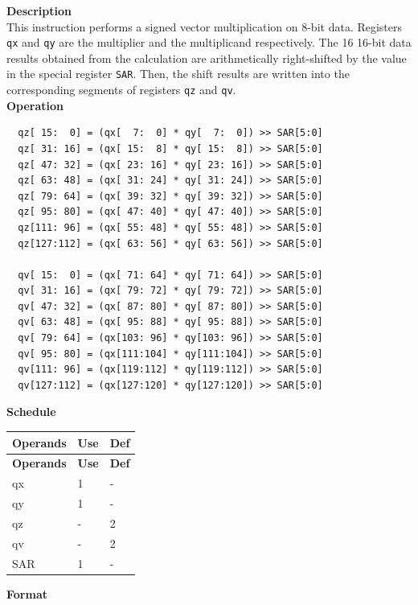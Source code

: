 \textbf{Description}\\
This instruction performs a signed vector multiplication on 8-bit data. Registers \lstinline{qx} and \lstinline{qy} are the multiplier and the multiplicand respectively. The 16 16-bit data results obtained from the calculation are arithmetically right-shifted by the value in the special register \lstinline{SAR}. Then, the shift results are written into the corresponding segments of registers \lstinline{qz} and \lstinline{qv}.\\
\textbf{Operation}
\begin{lstlisting}
  qz[ 15:  0] = (qx[  7:  0] * qy[  7:  0]) >> SAR[5:0]
  qz[ 31: 16] = (qx[ 15:  8] * qy[ 15:  8]) >> SAR[5:0]
  qz[ 47: 32] = (qx[ 23: 16] * qy[ 23: 16]) >> SAR[5:0]
  qz[ 63: 48] = (qx[ 31: 24] * qy[ 31: 24]) >> SAR[5:0]
  qz[ 79: 64] = (qx[ 39: 32] * qy[ 39: 32]) >> SAR[5:0]
  qz[ 95: 80] = (qx[ 47: 40] * qy[ 47: 40]) >> SAR[5:0]
  qz[111: 96] = (qx[ 55: 48] * qy[ 55: 48]) >> SAR[5:0]
  qz[127:112] = (qx[ 63: 56] * qy[ 63: 56]) >> SAR[5:0]

  qv[ 15:  0] = (qx[ 71: 64] * qy[ 71: 64]) >> SAR[5:0]
  qv[ 31: 16] = (qx[ 79: 72] * qy[ 79: 72]) >> SAR[5:0]
  qv[ 47: 32] = (qx[ 87: 80] * qy[ 87: 80]) >> SAR[5:0]
  qv[ 63: 48] = (qx[ 95: 88] * qy[ 95: 88]) >> SAR[5:0]
  qv[ 79: 64] = (qx[103: 96] * qy[103: 96]) >> SAR[5:0]
  qv[ 95: 80] = (qx[111:104] * qy[111:104]) >> SAR[5:0]
  qv[111: 96] = (qx[119:112] * qy[119:112]) >> SAR[5:0]
  qv[127:112] = (qx[127:120] * qy[127:120]) >> SAR[5:0]
\end{lstlisting}


\textbf{Schedule}\\
\begin{longtable}[c]{|l|l|l|}
    \hline
    \rowcolor{lightgray}
    \textbf{Operands} & \textbf{Use} & \textbf{Def} \\\hline
    \endfirsthead
    \hline
    \rowcolor{lightgray}
     \textbf{Operands} & \textbf{Use} & \textbf{Def} \\\hline
    \endhead
    \hline
    \endfoot

    qx & 1 & - \\\hline
  qy & 1 & - \\\hline
     qz & - & 2 \\\hline
     qv & - & 2 \\\hline
    SAR & 1 & -

\end{longtable}

\textbf{Format}\\

